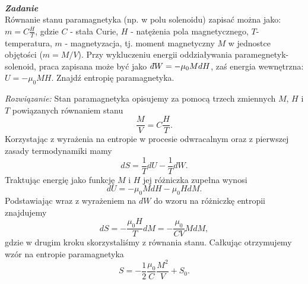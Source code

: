 \documentclass[11pt,a4paper]{article}
\newcounter{zadanie}\newcommand{\zadanie}[1][]{\addtocounter{zadanie}{1} ~\\  {\bf \emph{Zadanie \arabic{zadanie} #1 }} \\}
\newcommand{\dbar}{{\mkern3mu\mathchar'26\mkern-12mu d}}
\begin{document}
\newpage
\zadanie
Równanie stanu paramagnetyka (np. w polu solenoidu) zapisać można jako:
$m= C \frac{H}{T}$, 
gdzie $C$ - stała Curie, $H$ - natężenia pola magnetycznego, $T$- temperatura,
$m$ - magnetyzacja, tj. moment magnetyczny $M$ w jednostce objętości ($m=M/V$).
Przy wykluczeniu energii oddziaływania paramegnetyk-solenoid, praca zapisana może być jako
 $\dbar W = -\mu_0 M dH$, zaś energia wewnętrzna: $U=-\mu_0 M H$. Znajdź entropię paramagnetyka.

\vspace{5mm}
{\em Rozwiązanie:}
\newline
Stan paramagnetyka opisujemy za pomocą trzech zmiennych $M$, $H$ i $T$ powiązanych równaniem stanu
\begin{equation}
	\frac{M}{V} = C \frac{H}{T}. 
\end{equation}
Korzystając z wyrażenia na entropie w procesie odwracalnym oraz z pierwszej zasady termodynamiki mamy
\begin{equation}
	dS = \frac{1}{T} dU - \frac{1}{T} dW.
\end{equation}
Traktując energię jako funkcję $M$ i $H$ jej różniczka zupełna wynosi
\begin{equation}
	dU = - \mu_0 M dH - \mu_0 H dM. 
\end{equation}
Podstawiając wraz z wyrażeniem na $dW$ do wzoru na różniczkę entropii znajdujemy
\begin{equation}
	dS = - \frac{\mu_0 H} {T} dM = - \frac{\mu_0}{C V} M dM, 
\end{equation}
gdzie w drugim kroku skorzystaliśmy z równania stanu. Całkując otrzymujemy wzór na entropie paramagnetyka
\begin{equation}
	S = - \frac{1}{2} \frac{\mu_0}{C} \frac{M^2}{V}+S_0.
\end{equation}
\end{document}
